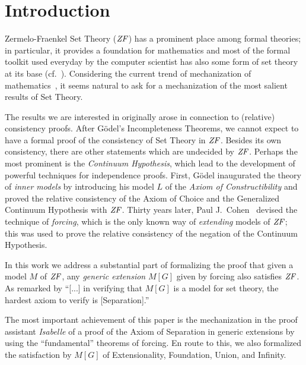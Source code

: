 \section{Introduction}
Zermelo-Fraenkel Set Theory ($\mathit{ZF}$) has a prominent place among formal
theories; in particular, it provides a foundation for mathematics and
most of the formal toolkit used everyday by the computer scientist has
also some form of set theory at its base
(cf.~\cite{paulson1995set}). Considering the current trend 
of mechanization of mathematics~\cite{avigad2018mechanization}, it
seems natural to ask for a mechanization of the most salient results
of Set Theory.

The results we are interested in originally arose in connection to
(relative) consistency proofs.
After G\"odel's Incompleteness Theorems, we cannot expect to have a
formal proof of the consistency of Set Theory in $\mathit{ZF}$. Besides its own
consistency, there are other statements which are undecided by $\mathit{ZF}$.
Perhaps the most prominent  is the
\emph{Continuum Hypothesis}, which lead to the development of powerful
techniques for independence proofs. First, G\"odel inaugurated the
theory of \emph{inner models} by introducing his model $L$ of
the \emph{Axiom of Constructibility} \cite{godel-L} and proved the
relative consistency of the Axiom of Choice and the Generalized
Continuum Hypothesis with $\mathit{ZF}$. Thirty years later, Paul
J.~Cohen~\cite{Cohen-CH-PNAS} devised the technique of \emph{forcing},
which is the only known way of \emph{extending} models of $\mathit{ZF}$; this
was used to prove the relative consistency of the 
negation of the Continuum Hypothesis. 

In this work we address a substantial part of formalizing the proof
that given a model $M$ of $\mathit{ZF}$, any \emph{generic extension} $M[G]$
given by forcing also satisfies $\mathit{ZF}$. As remarked by
\citet[][p.250]{kunen2011set} \enquote{[...] in verifying that $M[G]$
  is a model for set theory, the hardest axiom to verify is
  [Separation].}  

\medskip
{}
\medskip

The most important achievement of this paper is the
mechanization in the proof assistant \emph{Isabelle} of a proof of the
Axiom of Separation in 
generic extensions by using the ``fundamental'' theorems of forcing.
En route
to this, we also formalized the satisfaction by $M[G]$ of
Extensionality, Foundation, Union, and Infinity. %

